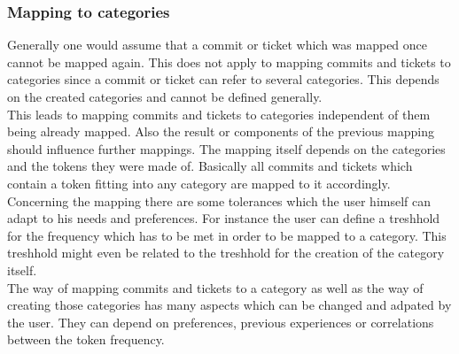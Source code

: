 \subsubsection{Mapping to categories}

Generally one would assume that a commit or ticket which was mapped once cannot be mapped again.
This does not apply to mapping commits and tickets to categories since a commit or ticket can refer to several categories.
This depends on the created categories and cannot be defined generally.\\
This leads to mapping commits and tickets to categories independent of them being already mapped.
Also the result or components of the previous mapping should influence further mappings.
The mapping itself depends on the categories and the tokens they were made of.
Basically all commits and tickets which contain a token fitting into any category are mapped to it accordingly. \\
Concerning the mapping there are some tolerances which the user himself can adapt to his needs and preferences.
For instance the user can define a treshhold for the frequency which has to be met in order to be mapped to a category.
This treshhold might even be related to the treshhold for the creation of the category itself. \\
The way of mapping commits and tickets to a category as well as the way of creating those categories has many aspects which can be changed and adpated by the user.
They can depend on preferences, previous experiences or correlations between the token frequency.

